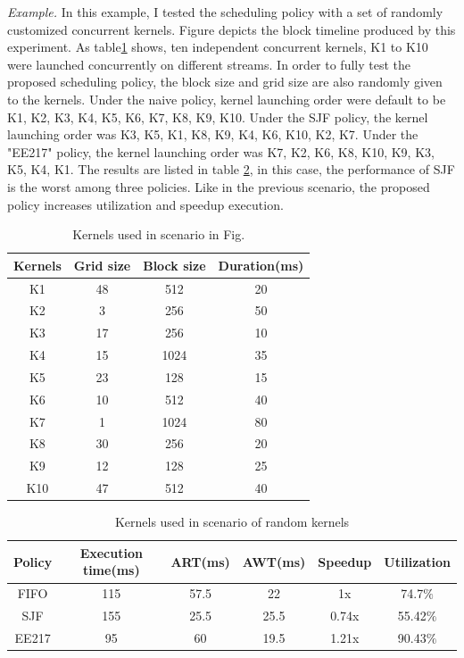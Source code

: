 \documentclass[conference]{IEEEtran}
\begin{document}
\textit{Example.}
In this example, I tested the scheduling policy with a set of randomly customized concurrent kernels. Figure depicts the block timeline produced by this experiment. As table\ref{table:scenario2_kernel} shows, ten independent concurrent kernels, K1 to K10 were launched concurrently on different streams. In order to fully test the proposed scheduling policy, the block size and grid size are also randomly given to the kernels. Under the naive policy, kernel launching order were default to be K1, K2, K3, K4, K5, K6, K7, K8, K9, K10. Under the SJF policy, the kernel launching order was K3, K5, K1, K8, K9, K4, K6, K10, K2, K7. Under the "EE217" policy, the kernel launching order was K7, K2, K6, K8, K10, K9, K3, K5, K4, K1. The results are listed in table \ref{table:scenario2_result}, in this case, the performance of SJF is the worst among three policies. Like in the previous scenario, the proposed policy increases utilization and speedup execution.\par

\begin{table}[h]
   \caption{Kernels used in scenario in Fig. } %
   \centering
   \begin{tabular}{|c|c|c|c|}
   \hline
   \bf Kernels & \bf Grid size & \bf Block size & \bf Duration(ms)\\
   \hline
   K1 & 48 & 512 & 20 \\
   K2 & 3 & 256 & 50\\ 
   K3 & 17 & 256 & 10 \\
   K4 & 15 & 1024 & 35 \\
   K5 & 23 & 128 & 15 \\ 
   K6 & 10 & 512 & 40 \\
   K7 & 1 & 1024 & 80 \\
   K8 & 30 & 256 & 20\\ 
   K9 & 12 & 128 & 25 \\
   K10 & 47 & 512 & 40 \\
   \hline
   \end{tabular}
   \label{table:scenario2_kernel}
\end{table}

\begin{table}[h]
   \caption{Kernels used in scenario of random kernels} %
   \centering
   \begin{tabular}{|c|c|c|c|c|c|}
   \hline
   \bf Policy & \bf Execution time(ms)& \bf ART(ms) & \bf AWT(ms) & \bf Speedup & \bf Utilization \\
   \hline
   FIFO & 115 & 57.5 & 22 & 1x & 74.7$\%$ \\
   SJF & 155 & 25.5 & 25.5 & 0.74x & 55.42$\%$ \\ 
   EE217 & 95 & 60 & 19.5 & 1.21x & 90.43$\%$ \\
   \hline
   \end{tabular}
   \label{table:scenario2_result}
\end{table}
\end{document}
